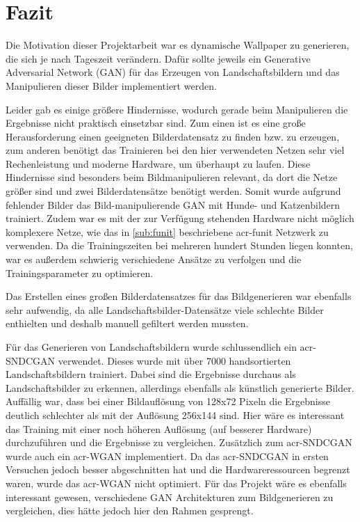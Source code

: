 \chapter{Fazit}\label{chp:fazit} %
\glsresetall

Die Motivation dieser Projektarbeit war es dynamische Wallpaper zu generieren, die sich je nach 
Tageszeit verändern. Dafür sollte jeweils ein Generative Adversarial Network (GAN) für das 
Erzeugen von Landschaftsbildern und das Manipulieren dieser Bilder 
implementiert werden. 

Leider gab es einige größere Hindernisse, wodurch gerade beim 
Manipulieren die Ergebnisse nicht praktisch einsetzbar sind. Zum einen ist es eine große 
Herausforderung einen geeigneten Bilderdatensatz zu finden bzw. zu erzeugen, zum 
anderen benötigt das Trainieren bei den hier verwendeten Netzen sehr viel Rechenleistung 
und moderne Hardware, um überhaupt zu laufen. Diese Hindernisse sind besonders beim 
Bildmanipulieren relevant, da dort die Netze größer sind und zwei Bilderdatensätze 
benötigt werden. Somit wurde aufgrund fehlender Bilder das Bild-manipulierende 
GAN mit Hunde- und Katzenbildern trainiert. Zudem war es mit der zur Verfügung 
stehenden Hardware nicht möglich komplexere Netze, wie das in \cref{sub:funit} 
beschriebene \gls{acr-funit} Netzwerk zu verwenden. Da die Trainingszeiten bei mehreren 
hundert Stunden liegen konnten, war es außerdem schwierig verschiedene Ansätze zu 
verfolgen und die Trainingsparameter zu optimieren. 

Das Erstellen eines großen Bilderdatensatzes für das Bildgenerieren war ebenfalls sehr 
aufwendig, da alle Landschaftsbilder-Datensätze viele schlechte Bilder enthielten und 
deshalb manuell gefiltert werden mussten. 

Für das Generieren von Landschaftsbildern wurde schlussendlich ein \gls{acr-SNDCGAN} 
verwendet. Dieses wurde mit über 7000 handsortierten Landschaftsbildern trainiert. 
Dabei sind die Ergebnisse durchaus als Landschaftsbilder zu erkennen, allerdings ebenfalls als künstlich generierte Bilder. Auffällig war, 
dass bei einer Bildauflösung von 128x72 Pixeln die Ergebnisse deutlich schlechter als 
mit der Auflösung 256x144 sind. Hier wäre es interessant das Training mit einer noch 
höheren Auflösung (auf besserer Hardware) durchzuführen und die Ergebnisse zu vergleichen. 
Zusätzlich zum  \gls{acr-SNDCGAN}  wurde auch ein \gls{acr-WGAN} implementiert. Da 
das \gls{acr-SNDCGAN} in ersten Versuchen jedoch besser abgeschnitten hat und die 
Hardwareressourcen begrenzt waren, wurde das \gls{acr-WGAN} nicht optimiert. Für das 
Projekt wäre es ebenfalls interessant gewesen, verschiedene GAN Architekturen 
zum Bildgenerieren zu vergleichen, dies hätte jedoch hier den Rahmen gesprengt.

